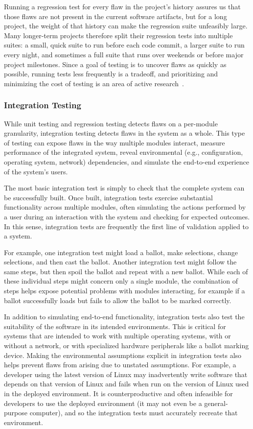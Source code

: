 Running a regression test for every flaw in the project's history
assures us that those flaws are not present in the current software
artifacts, but for a long project, the weight of that history can make
the regression suite unfeasibly large. Many longer-term projects
therefore split their regression tests into multiple suites: a small,
quick suite to run before each code commit, a larger suite to run
every night, and sometimes a full suite that runs over weekends or
before major project milestones. Since a goal of testing is to uncover
flaws as quickly as possible, running tests less frequently is a
tradeoff, and prioritizing and minimizing the cost of testing is an
area of active research~\cite{yoo2012regression}.

\subsubsection{Integration Testing}

While unit testing and regression testing detects flaws on a
per-module granularity, integration testing detects flaws in the
system as a whole. This type of testing can expose flaws in the way
multiple modules interact, measure performance of the integrated
system, reveal environmental (e.g., configuration, operating system,
network) dependencies, and simulate the end-to-end experience of the
system's users.

The most basic integration test is simply to check that the complete
system can be successfully built. Once built, integration tests
exercise substantial functionality across multiple modules, often
simulating the actions performed by a user during an interaction with
the system and checking for expected outcomes. In this sense,
integration tests are frequently the first line of validation applied
to a system.

For example, one integration test might load a ballot, make
selections, change selections, and then cast the ballot. Another
integration test might follow the same steps, but then spoil the
ballot and repeat with a new ballot. While each of these individual
steps might concern only a single module, the combination of steps
helps expose potential problems with modules interacting, for example
if a ballot successfully loads but fails to allow the ballot to be
marked correctly.

In addition to simulating end-to-end functionality, integration tests
also test the suitability of the software in its intended
environments. This is critical for systems that are intended to work
with multiple operating systems, with or without a network, or with
specialized hardware peripherals like a ballot marking device. Making
the environmental assumptions explicit in integration tests also helps
prevent flaws from arising due to unstated assumptions. For example, a
developer using the latest version of Linux may inadvertently write
software that depends on that version of Linux and fails when run on
the version of Linux used in the deployed environment. It is
counterproductive and often infeasible for developers to use the
deployed environment (it may not even be a general-purpose computer),
and so the integration tests must accurately recreate that
environment.

